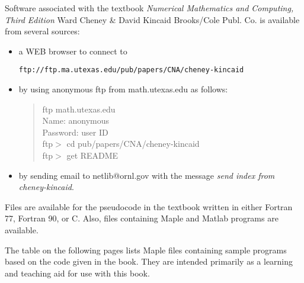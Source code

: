 

Software associated with the textbook 
{\em Numerical Mathematics and Computing, Third Edition}
Ward Cheney \& David Kincaid 
Brooks/Cole Publ. Co.
is available from several sources:

\begin{itemize}
\item
a WEB browser to connect to

{\tt ftp://ftp.ma.utexas.edu/pub/papers/CNA/cheney-kincaid}

\item
by using anonymous ftp from math.utexas.edu as follows:

\begin{verse}
ftp math.utexas.edu\\
Name: anonymous\\
Password: user ID\\
ftp$>$ cd pub/papers/CNA/cheney-kincaid\\
ftp$>$ get README 
\end{verse}

\item
 by sending email to netlib@ornl.gov
with the message {\em send index from cheney-kincaid}.
\end{itemize}

Files are available for the pseudocode in the textbook
written in either Fortran 77, Fortran 90, or C.
Also, files containing Maple and Matlab programs are available.

The table on the following pages lists Maple
files containing sample programs 
based on the code given in the book.
They are intended  primarily as a learning and teaching aid 
for use with this book.


